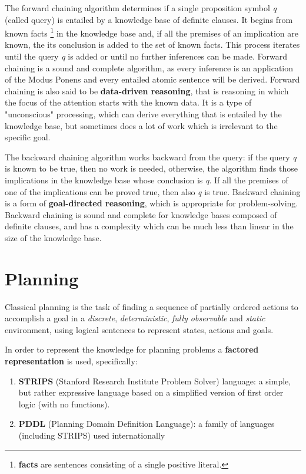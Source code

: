 \documentclass{article}
\begin{document}
The forward chaining algorithm determines if a single proposition symbol \textit{q} (called query) is entailed by a knowledge base of definite clauses. It begins from known facts \footnote{
\textbf{facts} are sentences consisting of a single positive literal.
} in the knowledge base and, if all the premises of an implication are known, the its conclusion is added to the set of known facts. This process iterates until the query \textit{q} is added or until no further inferences can be made. Forward chaining is a sound and complete algorithm, as every inference is an application of the Modus Ponens and every entailed atomic sentence will be derived. Forward chaining is also said to be \textbf{data-driven reasoning}, that is reasoning in which the focus of the attention starts with the known data. It is a type of "unconscious" processing, which can derive everything that is entailed by the knowledge base, but sometimes does a lot of work which is irrelevant to the specific goal.

The backward chaining algorithm works backward from the query: if the query \textit{q} is known to be true, then no work is needed, otherwise, the algorithm finds those implications in the knowledge base whose conclusion is \textit{q}. If all the premises of one of the implications can be proved true, then also \textit{q} is true. Backward chaining is a form of \textbf{goal-directed reasoning}, which is appropriate for problem-solving. Backward chaining is sound and complete for knowledge bases composed of definite clauses, and has a complexity which can be much less than linear in the size of the knowledge base.

\section{Planning}
Classical planning is the task of finding a sequence of partially ordered actions to accomplish a goal in a \textit{discrete}, \textit{deterministic}, \textit{fully observable} and \textit{static} environment, using logical sentences to represent states, actions and goals.

In order to represent the knowledge for planning problems a \textbf{factored representation} is used, specifically:
\begin{enumerate}
    \item \textbf{STRIPS} (Stanford Research Institute Problem Solver) language: a simple, but rather expressive language based on a simplified version of first order logic (with no functions).
    \item \textbf{PDDL} (Planning Domain Definition Language): a family of languages (including STRIPS) used internationally
\end{enumerate}
\end{document}
